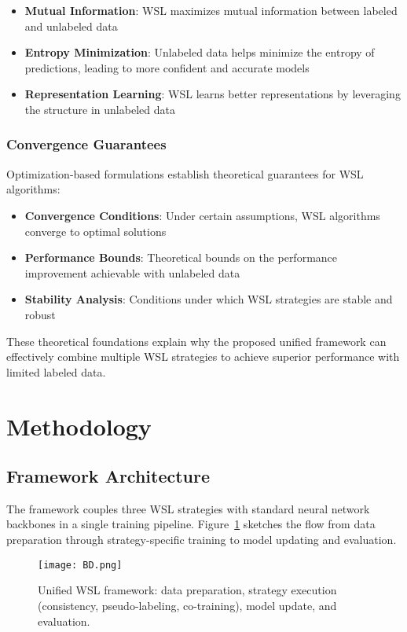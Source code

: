 \documentclass{ieeeaccess}
\begin{document}
\begin{itemize}
\item \textbf{Mutual Information}: WSL maximizes mutual information between labeled and unlabeled data
\item \textbf{Entropy Minimization}: Unlabeled data helps minimize the entropy of predictions, leading to more confident and accurate models
\item \textbf{Representation Learning}: WSL learns better representations by leveraging the structure in unlabeled data
\end{itemize}

\subsubsection{Convergence Guarantees}
Optimization-based formulations \cite{b29} establish theoretical guarantees for WSL algorithms:

\begin{itemize}
\item \textbf{Convergence Conditions}: Under certain assumptions, WSL algorithms converge to optimal solutions
\item \textbf{Performance Bounds}: Theoretical bounds on the performance improvement achievable with unlabeled data
\item \textbf{Stability Analysis}: Conditions under which WSL strategies are stable and robust
\end{itemize}

These theoretical foundations explain why the proposed unified framework can effectively combine multiple WSL strategies to achieve superior performance with limited labeled data.

\section{Methodology}
\label{sec:methodology}

\subsection{Framework Architecture}
The framework couples three WSL strategies with standard neural network backbones in a single training pipeline. Figure~\ref{fig:wsl_architecture} sketches the flow from data preparation through strategy-specific training to model updating and evaluation.

\begin{figure}[htbp]
\centering
\texttt{[image: BD.png]}
\caption{Unified WSL framework: data preparation, strategy execution (consistency, pseudo-labeling, co-training), model update, and evaluation.}
\label{fig:wsl_architecture}
\end{figure}
\end{document}
